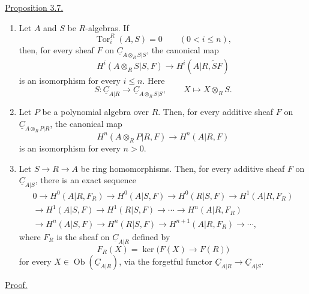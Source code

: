 
\underline{Proposition 3.7.}

\begin{enumerate}[label=(\alph*)]
\item Let $A$ and $S$ be $R$-algebras. If
\[
 \operatorname{Tor}_i^R(A,S)=0\qquad(0<i\leq n),
\]
then, for every sheaf $F$ on
$\underline C_{A\otimes_RS|S}$, the canonical map
\[
 H^i(A\otimes_RS|S,F)
 \longrightarrow H^i(A|R,\widetilde SF)
\]
is an isomorphism for every $i\leq n$. Here
\[
 S:\underline C_{A|R}\longrightarrow
 \underline C_{A\otimes_RS|S},
 \qquad X\longmapsto X\otimes_RS.
\]

\item Let $P$ be a polynomial algebra over $R$. Then, for every
additive sheaf $F$ on $\underline C_{A\otimes_RP|R}$, the
canonical map
\[
 H^n(A\otimes_RP|R,F)\longrightarrow H^n(A|R,F)
\]
is an isomorphism for every $n>0$.

\item Let $S\longrightarrow R\longrightarrow A$ be ring
homomorphisms. Then, for every additive sheaf $F$ on
$\underline C_{A|S}$, there is an exact sequence
\begin{multline*}
0\longrightarrow H^0(A|R,F_R)\longrightarrow H^0(A|S,F)
\longrightarrow H^0(R|S,F)\longrightarrow H^1(A|R,F_R)\\
\longrightarrow H^1(A|S,F)\longrightarrow H^1(R|S,F)
\longrightarrow\cdots\longrightarrow H^n(A|R,F_R)\\
\longrightarrow H^n(A|S,F)\longrightarrow H^n(R|S,F)
\longrightarrow H^{n+1}(A|R,F_R)\longrightarrow\cdots,
\end{multline*}
where $F_R$ is the sheaf on $\underline C_{A|R}$ defined by
\[
 F_R(X)=\ker\bigl(F(X)\longrightarrow F(R)\bigr)
\]
for every $X\in\operatorname{Ob}(\underline C_{A|R})$, via the
forgetful functor
$\underline C_{A|R}\longrightarrow\underline C_{A|S}$.
\end{enumerate}

\underline{Proof.}

